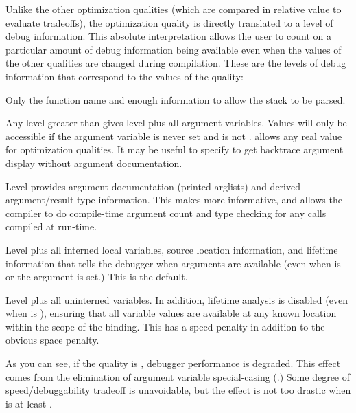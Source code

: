 Unlike the other optimization qualities (which are compared in relative value
to evaluate tradeoffs), the  optimization quality is directly
translated to a level of debug information.  This absolute interpretation
allows the user to count on a particular amount of debug information being
available even when the values of the other qualities are changed during
compilation.  These are the levels of debug information that correspond to the
values of the  quality:
\begin{Lentry}

\item[\code{0}]
Only the function name and enough information to allow the stack to
be parsed.

\item[\code{\w{$>$ 0}}]
Any level greater than  gives level  plus all
argument variables.  Values will only be accessible if the argument
variable is never set and
 is not .  \cmucl{} allows any real value for optimization
qualities.  It may be useful to specify  to get backtrace argument
display without argument documentation.

\item[\code{1}] Level  provides argument documentation
(printed arglists) and derived argument/result type information.
This makes  more informative, and allows the
compiler to do compile-time argument count and type checking for any
calls compiled at run-time.

\item[\code{2}]
Level  plus all interned local variables, source location
information, and lifetime information that tells the debugger when arguments
are available (even when  is  or the argument is set.)  This is
the default.

\item[\code{3}]
Level  plus all uninterned variables.  In addition, lifetime
analysis is disabled (even when  is ), ensuring that all variable
values are available at any known location within the scope of the binding.
This has a speed penalty in addition to the obvious space penalty.
\end{Lentry}

As you can see, if the  quality is , debugger performance is
degraded.  This effect comes from the elimination of argument variable
special-casing (.)  Some degree of
speed/debuggability tradeoff is unavoidable, but the effect is not too drastic
when  is at least .

